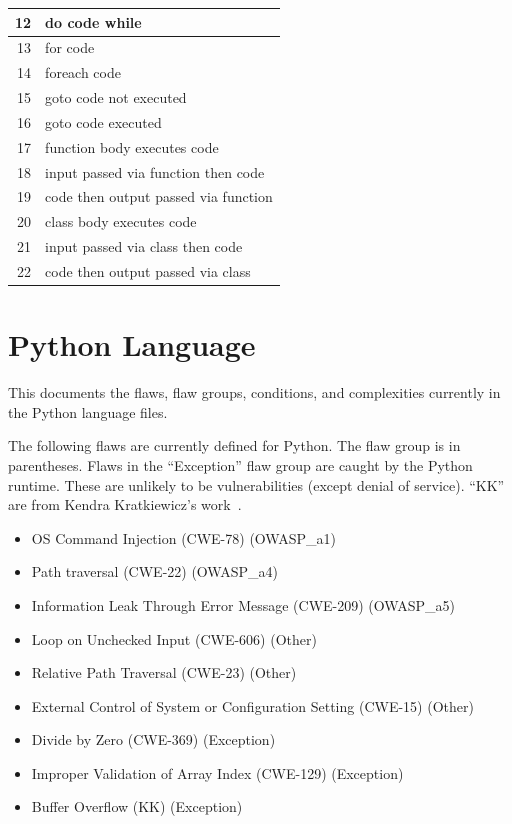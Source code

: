 \begin{appendices}
\begin{table}[H]
\begin{tabular}{|r|l|}
12 & do code while \\
\hline
13 & for code \\
\hline
14 & foreach code \\
\hline
15 & goto code not executed \\
\hline
16 & goto code executed \\
\hline
17 & function body executes code \\
\hline
18 & input passed via function then code \\
\hline
19 & code then output passed via function \\
\hline
20 & class body executes code \\
\hline
21 & input passed via class then code \\
\hline
22 & code then output passed via class \\
\hline
\end{tabular}
\label{tab:complexity IDs for PHP}
\end{table}

\newpage

\section{Python Language}
\label{sec:Python language}

This documents the flaws, flaw groups, conditions, and complexities currently in the
Python language files.

The following flaws are currently defined for Python.  The flaw group is in
parentheses.  Flaws in the ``Exception'' flaw group are caught by the Python runtime.
These are unlikely to be vulnerabilities (except denial of service).
``KK'' are from Kendra Kratkiewicz's work~\cite{Kratkiewicz2005}.
\begin{itemize}[nosep]
    \item OS Command Injection (CWE-78) (OWASP\_a1)
    \item Path traversal (CWE-22) (OWASP\_a4)
    \item Information Leak Through Error Message (CWE-209) (OWASP\_a5)
    \item Loop on Unchecked Input (CWE-606) (Other)
    \item Relative Path Traversal (CWE-23) (Other)
    \item External Control of System or Configuration Setting (CWE-15) (Other)
    \item Divide by Zero (CWE-369) (Exception)
    \item Improper Validation of Array Index (CWE-129) (Exception)
    \item Buffer Overflow (KK) (Exception)
\end{itemize}


\end{appendices}

